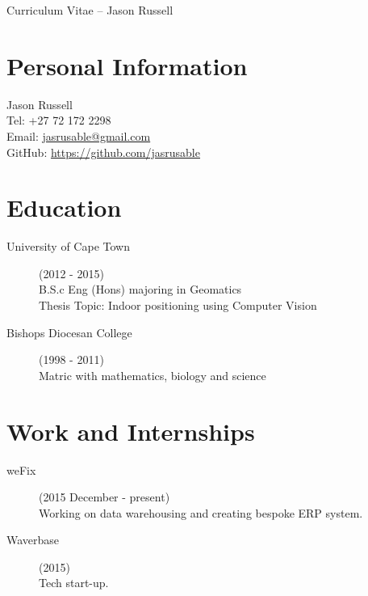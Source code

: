 \documentclass[margin,line,a4paper]{resume}
\begin{document}
    {\sc \Large Curriculum Vitae -- Jason Russell}
    \begin{resume}
        \vspace{0.5cm}

        \section{\mysidestyle Personal Information}
            Jason Russell\\
            Tel: +27 72 172 2298\\
            Email: \href{mailto:jasrusable@gmail.com}{jasrusable@gmail.com}\\
            GitHub: \href{https://github.com/jasrusable}{https://github.com/jasrusable}\\

        \section{\mysidestyle Education}
            \begin{description}
                \item[University of Cape Town] (2012 - 2015) \\
                    B.S.c Eng (Hons) majoring in Geomatics \\
                    Thesis Topic: Indoor positioning using Computer Vision
                   
                \item[Bishops Diocesan College] (1998 - 2011) \\
                Matric with mathematics, biology and science
            \end{description}


        \section{\mysidestyle Work and Internships}
            \begin{description}
                \item [weFix] (2015 December - present) \\
                    Working on data warehousing and creating bespoke ERP system.
            \end{description}
            
            \begin{description}
            	\item [Waverbase] (2015) \\
            	Tech start-up.
            \end{description}
            

\end{resume}
\end{document}
